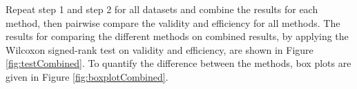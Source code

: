 \documentclass[main]{subfiles}
\begin{document}
Repeat step 1 and step 2 for all datasets and combine the results for each method, then pairwise compare the validity and efficiency for all methods. %
%
%
The results for comparing the different methods on combined results, by applying the Wilcoxon signed-rank test on validity and efficiency, are shown in Figure \ref{fig:testCombined}. To quantify the difference between the methods, box plots are given in Figure \ref{fig:boxplotCombined}.
\end{document}
